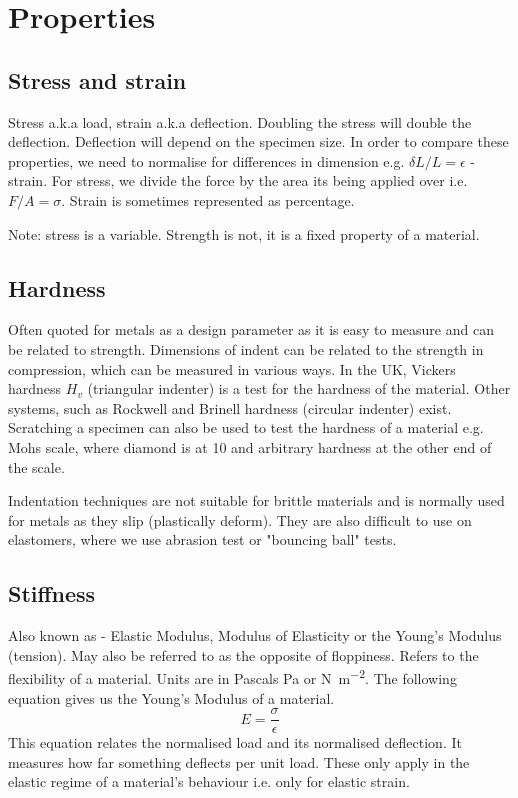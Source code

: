 \section{Properties}
\subsection{Stress and strain}
Stress a.k.a load, strain a.k.a deflection. Doubling the stress will double the deflection. Deflection will depend on the specimen size. In order to compare these properties, we need to normalise for differences in dimension e.g. \(\delta L / L = \epsilon\) - strain. For stress, we divide the force by the area its being applied over i.e. \(F/A = \sigma \). Strain is sometimes represented as percentage.

Note: stress is a variable. Strength is not, it is a fixed property of a material.
\subsection{Hardness}
Often quoted for metals as a design parameter as it is easy to measure and can be related to strength. Dimensions of indent can be related to the strength in compression, which can be measured in various ways. In the UK, Vickers hardness \(H_v\) (triangular indenter) is a test for the hardness of the material. Other systems, such as Rockwell and Brinell hardness (circular indenter) exist. Scratching a specimen can also be used to test the hardness of a material e.g. Mohs scale, where diamond is at 10 and arbitrary hardness at the other end of the scale.

Indentation techniques are not suitable for brittle materials and is normally used for metals as they slip (plastically deform). They are also difficult to use on elastomers, where we use abrasion test or "bouncing ball" tests.
\subsection{Stiffness}
Also known as - Elastic Modulus, Modulus of Elasticity or the Young's Modulus (tension). May also be referred to as the opposite of floppiness. Refers to the flexibility of a material. Units are in Pascals \si{\pascal} or \si{\newton\per\meter\squared}. The following equation gives us the Young's Modulus of a material.
\begin{equation}
  E = \frac{\sigma}{\epsilon}
\end{equation}
This equation relates the normalised load and its normalised deflection. It measures how far something deflects per unit load. These only apply in the elastic regime of a material's behaviour i.e. only for elastic strain.
